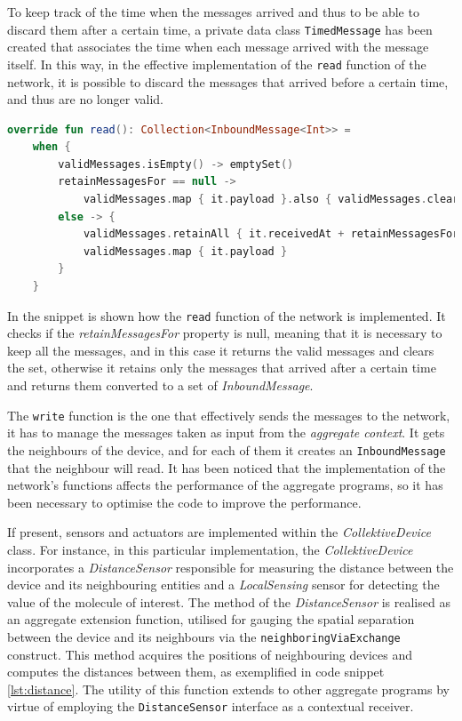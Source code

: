 To keep track of the time when the messages arrived and thus to be able to discard them after a certain time,
a private data class \texttt{TimedMessage} has been created that associates the time when each message arrived with the message itself.
In this way, in the effective implementation of the \texttt{read} function of the network, it is possible
to discard the messages that arrived before a certain time, and thus are no longer valid.

\begin{lstlisting}[language=kt,label={lst:read},caption={The implementation of the \texttt{read} function of the \texttt{Network}.}]
override fun read(): Collection<InboundMessage<Int>> =
    when {
        validMessages.isEmpty() -> emptySet()
        retainMessagesFor == null ->
            validMessages.map { it.payload }.also { validMessages.clear() }
        else -> {
            validMessages.retainAll { it.receivedAt + retainMessagesFor >= currentTime }
            validMessages.map { it.payload }
        }
    }
\end{lstlisting}

In the  snippet is shown how the \texttt{read} function of the network is implemented.
It checks if the \emph{retainMessagesFor} property is null, meaning that it is necessary to keep all the messages,
and in this case it returns the valid messages and clears the set, otherwise it retains only the messages that arrived
after a certain time and returns them converted to a set of \emph{InboundMessage}.

The \texttt{write} function is the one that effectively sends the messages to the network, it has to manage the messages
taken as input from the \emph{aggregate context}.
It gets the neighbours of the device, and for each of them it creates an \texttt{InboundMessage} that the neighbour will read.
It has been noticed that the implementation of the network's functions affects the performance of the aggregate programs,
so it has been necessary to optimise the code to improve the performance.

If present, sensors and actuators are implemented within the \emph{CollektiveDevice} class.
For instance, in this particular implementation, the \emph{CollektiveDevice} incorporates a \emph{DistanceSensor} responsible for
measuring the distance between the device and its neighbouring entities and a \emph{LocalSensing} sensor for detecting the
value of the molecule of interest.
The method of the \emph{DistanceSensor} is realised as an aggregate extension function, utilised for gauging the spatial
separation between the device and its neighbours via the \texttt{neighboringViaExchange} construct.
This method acquires the positions of neighbouring devices and computes the distances between them, as exemplified in code snippet \ref{lst:distance}.
The utility of this function extends to other aggregate programs by virtue of employing the \texttt{DistanceSensor} interface as a contextual receiver.

